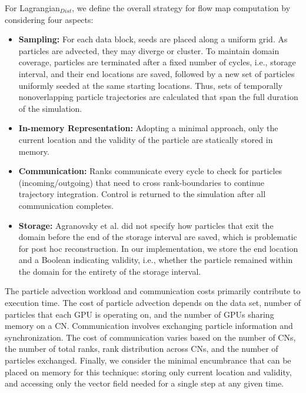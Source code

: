 For Lagrangian$_{Dist}$, we define the overall strategy for flow map computation by considering four aspects:
%
\begin{itemize}[leftmargin=*]
\item\textbf{Sampling:} For each data block, seeds are placed along a uniform grid. As particles are advected, they may diverge or cluster. 
%
To maintain domain coverage, particles are terminated after a fixed number of cycles, i.e., storage interval, and their end locations are saved, followed by a new set of particles uniformly seeded at the same starting locations.
%
Thus, sets of temporally nonoverlapping particle trajectories are calculated that span the full duration of the simulation.
%
\item\textbf{In-memory Representation:} %
%
Adopting a minimal approach, only the current location and the validity of the particle are statically stored in memory. 
%
\item\textbf{Communication:} Ranks communicate every cycle to check for particles (incoming/outgoing) that need to cross rank-boundaries to continue trajectory integration. 
%
Control is returned to the simulation after all communication completes.
\item\textbf{Storage:} Agranovsky et al. did not specify how particles that exit the domain before the end of the storage interval are saved,
%
which is problematic for post hoc reconstruction. 
%
In our implementation, we store the end location and a Boolean indicating validity, i.e., whether the particle remained within the domain for the entirety of the storage interval. 
%
%
\end{itemize}

%
The particle advection workload and communication costs primarily contribute to execution time.
%
%
The cost of particle advection depends on the data set, number of particles that each GPU is operating on, and the number of GPUs sharing memory on a CN.
%
Communication involves exchanging particle information and synchronization. 
%
The cost of communication varies based on the number of CNs, the number of total ranks, rank distribution across CNs, and the number of particles exchanged.
%
Finally, we consider the minimal encumbrance that can be placed on memory for this technique: storing only current location and validity, and accessing only the vector field needed for a single step at any given time.
%
%
